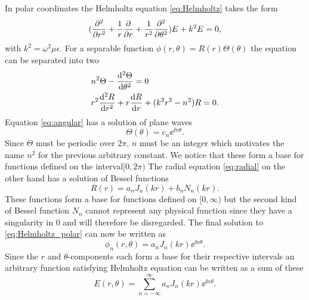 \documentclass[11pt,a4paper, 
swedish,english %
]{article}
\begin{document}
In polar coordinates the Helmholtz equation \eqref{eq:Helmholtz} takes the form
\begin{equation}
\label{eq:Helmholtz_polar}
(\pdv[2]{r}+\frac{1}{r}\pdv{r}+\frac{1}{r^2}\pdv[2]{\theta})E+k^2E=0,
\end{equation}
with $k^2=\omega^2\mu\epsilon$. For a separable function $\phi(r,\theta)=R(r)\Theta(\theta)$ the equation can be separated into two
\begin{align}
&n^2\Theta-\dv[2]{\Theta}{\theta}=0 \label{eq:angular} \\
&r^2\dv[2]{R}{r}+r\dv{R}{r}+(k^2r^2-n^2)R=0 \label{eq:radial}.
\end{align}
Equation \eqref{eq:angular} has a solution of plane waves
\begin{equation}
\label{eq:sol_angular}
\Theta(\theta)=c_n\ee^{\ii n \theta}.
\end{equation}
Since $\Theta$ must be periodic over $2\pi$, $n$ must be an integer which motivates the name $n^2$ for the previous arbitrary constant. We notice that these form a base for functions defined on the interval$[0,2\pi)$
The radial equation \eqref{eq:radial} on the other hand has a solution of Bessel functions
\begin{equation}
\label{eq:sol_radial}
R(r)=a_nJ_{n}(kr)+b_nN_{n}(kr).
\end{equation}
These functions form a base for functions defined on $[0,\infty)$ but the second kind of Bessel function $N_n$  cannot represent any physical function since they have a singularity in 0 and will therefore be disregarded.
The final solution to \eqref{eq:Helmholtz_polar} can now be written as
\begin{equation*}
\phi_n(r,\theta)=a_nJ_n(kr)\ee^{\ii n \theta}.
\end{equation*}
Since the $r$ and $\theta$-components each form a base for their respective intervals an arbitrary function satisfying Helmholtz equation can be written as a sum of these
\begin{equation}
E(r,\theta)=\sum_{n=-\infty}^{\infty} a_nJ_n(kr)\ee^{\ii n \theta}.
\end{equation}
\end{document}
